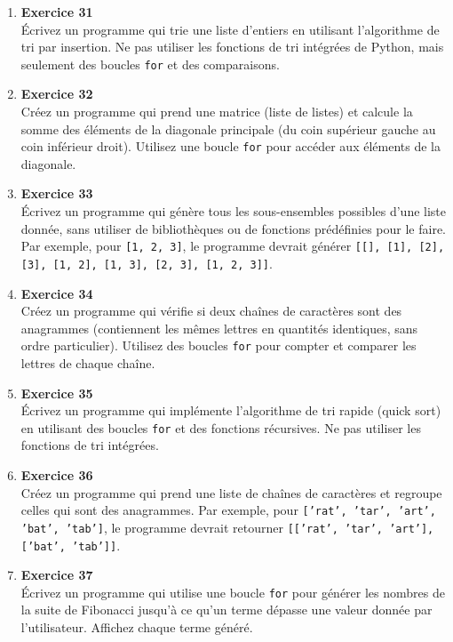 \documentclass{article}
\begin{document}
\begin{enumerate}

    \item \textbf{Exercice 31} \\
    Écrivez un programme qui trie une liste d'entiers en utilisant l'algorithme de tri par insertion. Ne pas utiliser les fonctions de tri intégrées de Python, mais seulement des boucles \texttt{for} et des comparaisons.

    \item \textbf{Exercice 32} \\
    Créez un programme qui prend une matrice (liste de listes) et calcule la somme des éléments de la diagonale principale (du coin supérieur gauche au coin inférieur droit). Utilisez une boucle \texttt{for} pour accéder aux éléments de la diagonale.

    \item \textbf{Exercice 33} \\
    Écrivez un programme qui génère tous les sous-ensembles possibles d'une liste donnée, sans utiliser de bibliothèques ou de fonctions prédéfinies pour le faire. Par exemple, pour \texttt{[1, 2, 3]}, le programme devrait générer \texttt{[[], [1], [2], [3], [1, 2], [1, 3], [2, 3], [1, 2, 3]]}.

    \item \textbf{Exercice 34} \\
    Créez un programme qui vérifie si deux chaînes de caractères sont des anagrammes (contiennent les mêmes lettres en quantités identiques, sans ordre particulier). Utilisez des boucles \texttt{for} pour compter et comparer les lettres de chaque chaîne.

    \item \textbf{Exercice 35} \\
    Écrivez un programme qui implémente l'algorithme de tri rapide (quick sort) en utilisant des boucles \texttt{for} et des fonctions récursives. Ne pas utiliser les fonctions de tri intégrées.

    \item \textbf{Exercice 36} \\
    Créez un programme qui prend une liste de chaînes de caractères et regroupe celles qui sont des anagrammes. Par exemple, pour \texttt{['rat', 'tar', 'art', 'bat', 'tab']}, le programme devrait retourner \texttt{[['rat', 'tar', 'art'], ['bat', 'tab']]}.

    \item \textbf{Exercice 37} \\
    Écrivez un programme qui utilise une boucle \texttt{for} pour générer les nombres de la suite de Fibonacci jusqu'à ce qu'un terme dépasse une valeur donnée par l'utilisateur. Affichez chaque terme généré.


\end{enumerate}
\end{document}
